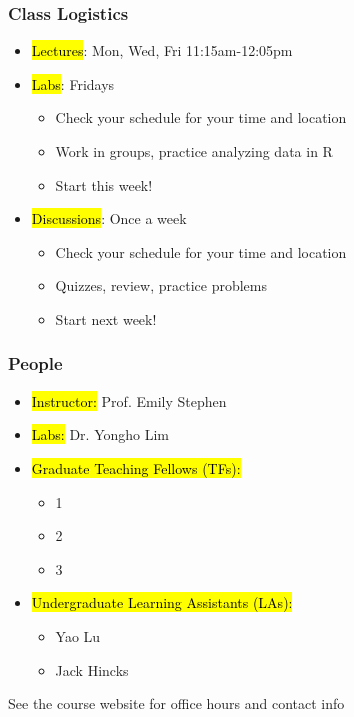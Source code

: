 \documentclass[slidestop,compress,mathserif]{beamer}
\begin{document}
\begin{frame}
	\frametitle{Class Logistics}
	\begin{itemize}
		\item \hl{Lectures}: Mon, Wed, Fri 11:15am-12:05pm
		\item \hl{Labs}: Fridays
		\begin{itemize}
			\item Check your schedule for your time and location
			\item Work in groups, practice analyzing data in R
			\item Start this week!
		\end{itemize}
		\item \hl{Discussions}: Once a week
		\begin{itemize}
			\item Check your schedule for your time and location
			\item Quizzes, review, practice problems
			\item Start next week!
		\end{itemize}
	\end{itemize}
\end{frame}

\begin{frame}
	\frametitle{People}
	\begin{itemize}
		\item \hl{Instructor:} Prof. Emily Stephen
		\item \hl{Labs:} Dr. Yongho Lim
		\item \hl{Graduate Teaching Fellows (TFs):} 
		\begin{itemize}
			\item 1
			\item 2
			\item 3
		\end{itemize}
		\item \hl{Undergraduate Learning Assistants (LAs):}
		\begin{itemize}
			\item Yao Lu
			\item Jack Hincks
		\end{itemize}
	\end{itemize}

	See the course website for office hours and contact info
\end{frame}

\end{document}
